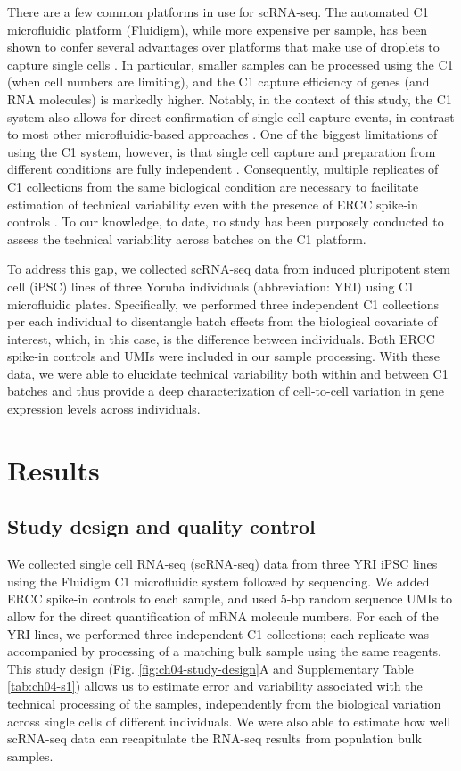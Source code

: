 There are a few common platforms in use for scRNA-seq. The automated
C1 microfluidic platform (Fluidigm), while more expensive per sample,
has been shown to confer several advantages over platforms that make
use of droplets to capture single cells \citep{Wu2014,
  Macosko2015}. In particular, smaller samples can be processed using
the C1 (when cell numbers are limiting), and the C1 capture efficiency
of genes (and RNA molecules) is markedly higher. Notably, in the
context of this study, the C1 system also allows for direct
confirmation of single cell capture events, in contrast to most other
microfluidic-based approaches \citep{Macosko2015, Klein2015}. One of
the biggest limitations of using the C1 system, however, is that
single cell capture and preparation from different conditions are
fully independent \citep{Hicks2015}.  Consequently, multiple
replicates of C1 collections from the same biological condition are
necessary to facilitate estimation of technical variability even with
the presence of ERCC spike-in controls \citep{Stegle2015}. To our
knowledge, to date, no study has been purposely conducted to assess
the technical variability across batches on the C1 platform.

To address this gap, we collected scRNA-seq data from induced
pluripotent stem cell (iPSC) lines of three Yoruba individuals
(abbreviation: YRI) using C1 microfluidic plates. Specifically, we
performed three independent C1 collections per each individual to
disentangle batch effects from the biological covariate of interest,
which, in this case, is the difference between individuals. Both ERCC
spike-in controls and UMIs were included in our sample
processing. With these data, we were able to elucidate technical
variability both within and between C1 batches and thus provide a deep
characterization of cell-to-cell variation in gene expression levels
across individuals.

\section{Results}\label{ch04-results}

\subsection{Study design and quality
control}\label{study-design-and-quality-control}

We collected single cell RNA-seq (scRNA-seq) data from three YRI iPSC
lines using the Fluidigm C1 microfluidic system followed by
sequencing.  We added ERCC spike-in controls to each sample, and used
5-bp random sequence UMIs to allow for the direct quantification of
mRNA molecule numbers. For each of the YRI lines, we performed three
independent C1 collections; each replicate was accompanied by
processing of a matching bulk sample using the same reagents. This
study design (Fig. \ref{fig:ch04-study-design}A and Supplementary
Table \ref{tab:ch04-s1}) allows us to estimate error and variability
associated with the technical processing of the samples, independently
from the biological variation across single cells of different
individuals. We were also able to estimate how well scRNA-seq data can
recapitulate the RNA-seq results from population bulk samples.

